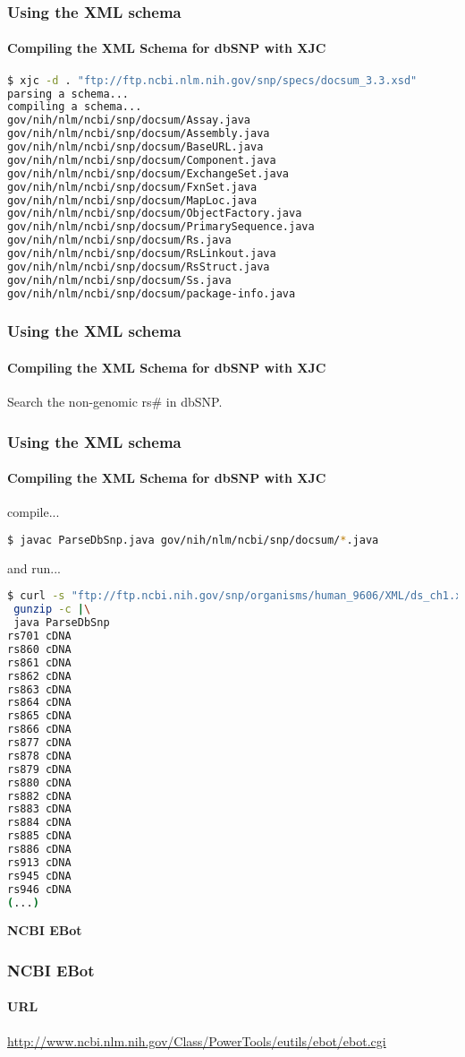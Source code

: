 \documentclass{beamer}
\newcommand{\centeredtitle}[1]{
\begin{center}
    \Huge{\bf{#1}}
\end{center}
}
\newcommand{\hugeslide}[1]{
\begin{frame}
\centeredtitle{#1}
\end{frame}
}
\begin{document}
\begin{frame}[fragile]
\frametitle{Using the XML schema}
\framesubtitle{Compiling the XML Schema for dbSNP with XJC}

\begin{lstlisting}[language=bash,basicstyle=\tiny,breaklines=false]
$ xjc -d . "ftp://ftp.ncbi.nlm.nih.gov/snp/specs/docsum_3.3.xsd"
parsing a schema...
compiling a schema...
gov/nih/nlm/ncbi/snp/docsum/Assay.java
gov/nih/nlm/ncbi/snp/docsum/Assembly.java
gov/nih/nlm/ncbi/snp/docsum/BaseURL.java
gov/nih/nlm/ncbi/snp/docsum/Component.java
gov/nih/nlm/ncbi/snp/docsum/ExchangeSet.java
gov/nih/nlm/ncbi/snp/docsum/FxnSet.java
gov/nih/nlm/ncbi/snp/docsum/MapLoc.java
gov/nih/nlm/ncbi/snp/docsum/ObjectFactory.java
gov/nih/nlm/ncbi/snp/docsum/PrimarySequence.java
gov/nih/nlm/ncbi/snp/docsum/Rs.java
gov/nih/nlm/ncbi/snp/docsum/RsLinkout.java
gov/nih/nlm/ncbi/snp/docsum/RsStruct.java
gov/nih/nlm/ncbi/snp/docsum/Ss.java
gov/nih/nlm/ncbi/snp/docsum/package-info.java
\end{lstlisting}
\end{frame}


\begin{frame}[fragile]
\frametitle{Using the XML schema}
\framesubtitle{Compiling the XML Schema for dbSNP with XJC}
Search the non-genomic rs\# in dbSNP.

\end{frame}

\begin{frame}[fragile]
\frametitle{Using the XML schema}
\framesubtitle{Compiling the XML Schema for dbSNP with XJC}
compile...
\begin{lstlisting}[language=bash,basicstyle=\tiny,breaklines=false]
$ javac ParseDbSnp.java gov/nih/nlm/ncbi/snp/docsum/*.java
\end{lstlisting}
and run...
\begin{lstlisting}[language=bash,basicstyle=\tiny,breaklines=false]
$ curl -s "ftp://ftp.ncbi.nih.gov/snp/organisms/human_9606/XML/ds_ch1.xml.gz" |\
 gunzip -c |\
 java ParseDbSnp
rs701 cDNA
rs860 cDNA
rs861 cDNA
rs862 cDNA
rs863 cDNA
rs864 cDNA
rs865 cDNA
rs866 cDNA
rs877 cDNA
rs878 cDNA
rs879 cDNA
rs880 cDNA
rs882 cDNA
rs883 cDNA
rs884 cDNA
rs885 cDNA
rs886 cDNA
rs913 cDNA
rs945 cDNA
rs946 cDNA
(...)
\end{lstlisting}
\end{frame}


\hugeslide{NCBI EBot}

\begin{frame}[fragile]
\frametitle{NCBI EBot}
\framesubtitle{URL}
\url{http://www.ncbi.nlm.nih.gov/Class/PowerTools/eutils/ebot/ebot.cgi}
\end{frame}
\end{document}
